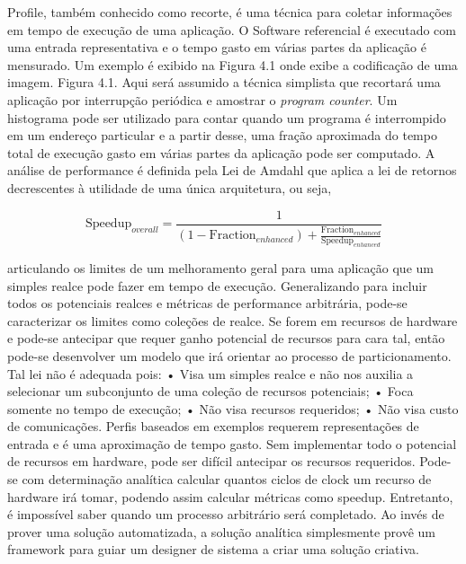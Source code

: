 Profile, também conhecido como recorte, é uma técnica para coletar informações em tempo de execução de uma aplicação. O Software referencial é executado com uma entrada representativa e o tempo gasto em várias partes da aplicação é mensurado. Um exemplo é exibido na Figura 4.1 onde exibe a codificação de uma imagem.
Figura 4.1.
Aqui será assumido a técnica simplista que recortará uma aplicação por interrupção periódica e amostrar o \textit{program counter}. Um histograma pode ser utilizado para contar quando um programa é interrompido em um endereço particular e a partir desse, uma fração aproximada do tempo total de execução gasto em várias partes da aplicação pode ser computado.
A análise de performance é definida pela Lei de Amdahl que aplica a lei de retornos decrescentes à utilidade de uma única arquitetura, ou seja, 

$$ \text{Speedup}_{overall} = \frac{1}{(1 - \text{Fraction}_{enhanced}) + \frac{\text{Fraction}_{enhanced}}{\text{Speedup}_{enhanced}}} $$

articulando os limites de um melhoramento geral para uma aplicação que um simples realce pode fazer em tempo de execução. Generalizando para incluir todos os potenciais realces e métricas de performance arbitrária, pode-se caracterizar os limites como coleções de realce. Se forem em recursos de hardware e pode-se antecipar que requer ganho potencial de recursos para cara tal, então pode-se desenvolver um modelo que irá orientar ao processo de particionamento. Tal lei não é adequada pois:
•	Visa um simples realce e não nos auxilia a selecionar um subconjunto de uma coleção de recursos potenciais;
•	Foca somente no tempo de execução;
•	Não visa recursos requeridos;
•	Não visa custo de comunicações.
Perfis baseados em exemplos requerem representações de entrada e é uma aproximação de tempo gasto. Sem implementar todo o potencial de recursos em hardware, pode ser difícil antecipar os recursos requeridos. Pode-se com determinação analítica calcular quantos ciclos de clock um recurso de hardware irá tomar, podendo assim calcular métricas como speedup. Entretanto, é impossível saber quando um processo arbitrário será completado. Ao invés de prover uma solução automatizada, a solução analítica simplesmente provê um framework para guiar um designer de sistema a criar uma solução criativa.

